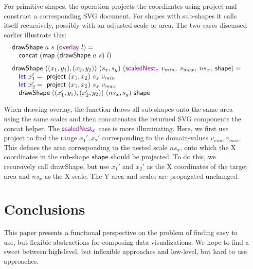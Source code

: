 \documentclass{jfp}
\newcommand{\ident}[1]{\textnormal{\textcolor{idclr}{\sffamily #1}}}
\newcommand{\kvd}[1]{\textnormal{\textcolor{kvdclr}{\sffamily #1}}}
\newcommand{\fkvd}[1]{\textnormal{\textcolor{fkvdclr}{\sffamily #1}}}
\begin{document}
\vspace{-1.25em}
\noindent
For primitive shapes, the operation projects the coordinates using \ident{project} and construct
a corresponding SVG document. For shapes with sub-shapes it calls itself recursively, possibly
with an adjusted scale or area. The two cases discussed earlier illustrate this:
%
\begin{equation*}
\begin{array}{l}
\ident{drawShape}~a~s~(\kvd{overlay}~l) = \\
\quad\ident{concat}~(\ident{map}~(\ident{drawShape}~a~s)~l)\\
\\[-0.5em]
\ident{drawShape}~((x_1, y_1), (x_2, y_2))~(s_x, s_y)~(\kvd{scaledNest}_x~v_{min},\;v_{max},\;{ns}_x,\;\ident{shape}) = \\
\quad\fkvd{let}~x_1' = \ident{project}~(x_1, x_2)~s_x~v_{min}\\
\quad\fkvd{let}~x_2' = \ident{project}~(x_1, x_2)~s_x~v_{max}\\
\quad\ident{drawShape}~((x_1', y_1), (x_2', y_2))~({ns}_x, s_y)~\ident{shape}\\
\end{array}
\end{equation*}

\vspace{-0.5em}
\noindent
When drawing \kvd{overlay}, the function draws all sub-shapes onto the same
area using the same scales and then concatenates the returned SVG components the \ident{concat} helper.
The $\kvd{scaledNest}_x$ case is more illuminating. Here, we first
use \ident{project} to find the range $x_1', x_2'$ corresponding to the domain-values
$v_{min},v_{max}$. This defines the area corresponding to the nested scale ${ns}_x$, onto
which the X coordinates in the sub-shape $\ident{shape}$ should be projected.
To do this, we recursively call \ident{drawShape}, but use $x_1'$ and $x_2'$ as the X coordinates
of the target area and ${ns}_x$ as the X scale. The Y area and scales are propagated unchanged.

\section{Conclusions}
This paper presents a functional perspective on the problem of finding easy to use, but flexible
abstractions for composing data visualizations. We hope to find a sweet between high-level, but
inflexible approaches and low-level, but hard to use approaches.
\end{document}
